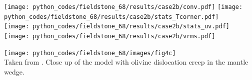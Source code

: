 \begin{center}
\texttt{[image: python\_codes/fieldstone\_68/results/case2b/conv.pdf]}
\texttt{[image: python\_codes/fieldstone\_68/results/case2b/stats\_Tcorner.pdf]}\\
\texttt{[image: python\_codes/fieldstone\_68/results/case2b/stats\_uv.pdf]}
\texttt{[image: python\_codes/fieldstone\_68/results/case2b/vrms.pdf]}
\end{center}

\begin{center}
\texttt{[image: python\_codes/fieldstone\_68/images/fig4c]}\\
{\captionfont Taken from \cite{vack08}. 
Close up of the model with olivine dislocation creep in the mantle wedge.}
\end{center}





 


